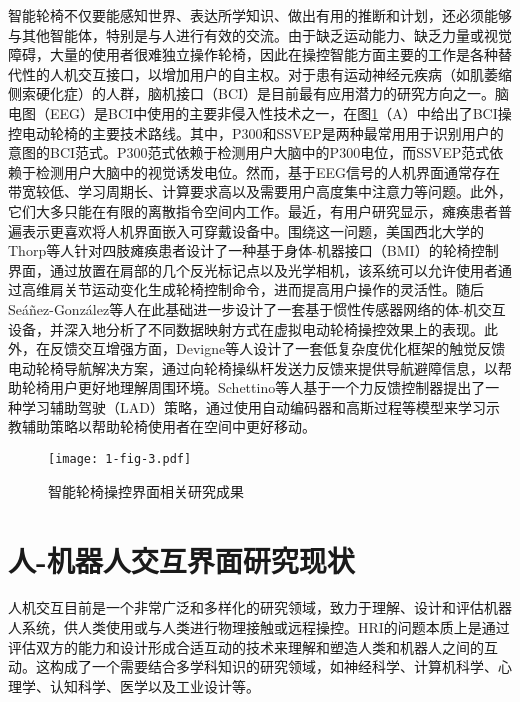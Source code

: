 智能轮椅不仅要能感知世界、表达所学知识、做出有用的推断和计划，还必须能够与其他智能体，特别是与人进行有效的交流。由于缺乏运动能力、缺乏力量或视觉障碍，大量的使用者很难独立操作轮椅\cite{hartmanHumanMachineInterfaceSmart2019}，因此在操控智能方面主要的工作是各种替代性的人机交互接口，以增加用户的自主权。对于患有运动神经元疾病（如肌萎缩侧索硬化症）的人群，脑机接口（BCI）是目前最有应用潜力的研究方向之一。脑电图（EEG）是BCI中使用的主要非侵入性技术之一，在图\ref{fig:1-3}（A）中给出了BCI操控电动轮椅的主要技术路线\cite{naserPracticalBCIDrivenWheelchairs2023}。其中，P300和SSVEP是两种最常用用于识别用户的意图的BCI范式。P300范式依赖于检测用户大脑中的P300电位\cite{rebsamenBrainControlledWheelchair2010}，而SSVEP范式依赖于检测用户大脑中的视觉诱发电位\cite{dongMultimodalBrainComputer2022,ngIndirectControlAutonomous2020a}。然而，基于EEG信号的人机界面通常存在带宽较低、学习周期长、计算要求高以及需要用户高度集中注意力等问题。此外，它们大多只能在有限的离散指令空间内工作。最近，有用户研究显示，瘫痪患者普遍表示更喜欢将人机界面嵌入可穿戴设备中\cite{zhangUnderstandingInteractionsSmart2022}。围绕这一问题，美国西北大学的Thorp等人\cite{thorpUpperBodyBasedPower2016d}针对四肢瘫痪患者设计了一种基于身体-机器接口（BMI）的轮椅控制界面，通过放置在肩部的几个反光标记点以及光学相机，该系统可以允许使用者通过高维肩关节运动变化生成轮椅控制命令，进而提高用户操作的灵活性。随后Seáñez-González等人在此基础进一步设计了一套基于惯性传感器网络的体-机交互设备，并深入地分析了不同数据映射方式在虚拟电动轮椅操控效果上的表现。此外，在反馈交互增强方面，Devigne等人\cite{devigneDesignHapticGuidance2018}设计了一套低复杂度优化框架的触觉反馈电动轮椅导航解决方案，通过向轮椅操纵杆发送力反馈来提供导航避障信息，以帮助轮椅用户更好地理解周围环境。Schettino等人\cite{schettinoImprovingGeneralisationLearning2020}基于一个力反馈控制器提出了一种学习辅助驾驶（LAD）策略，通过使用自动编码器和高斯过程等模型来学习示教辅助策略以帮助轮椅使用者在空间中更好移动。
\begin{figure}[h]
  \centering
  \texttt{[image: 1-fig-3.pdf]}
  \caption{智能轮椅操控界面相关研究成果}
  \label{fig:1-3}
\end{figure}

\section{人-机器人交互界面研究现状}
人机交互目前是一个非常广泛和多样化的研究领域，致力于理解、设计和评估机器人系统，供人类使用或与人类进行物理接触或远程操控。HRI的问题本质上是通过评估双方的能力和设计形成合适互动的技术来理解和塑造人类和机器人之间的互动。这构成了一个需要结合多学科知识的研究领域，如神经科学、计算机科学、心理学、认知科学、医学以及工业设计等\cite{mohebbiHumanRobotInteractionRehabilitation2020a}。
